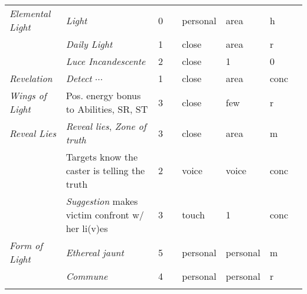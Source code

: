 \documentclass[10pt,a4paper]{article}
\begin{document}
\begin{table}[htbp!]
\begin{tabular}{llllllll}
    \hline
    \multirow{1}{*}{\textit{Elemental Light}} & \textit{Light} & 0 && personal & area & h \\
    										& \textit{Daily Light} & 1 && close & area & r \\
    										& \textit{Luce Incandescente} & 2 && close & 1 & 0 \\
    										
    \hline
    \multirow{1}{*}{\textit{Revelation}} & \textit{Detect $\cdots$} & 1 && close & area & conc \\
    \hline
    \multirow{1}{*}{\textit{Wings of Light}} & Pos. energy bonus to Abilities, SR, ST & 3 && close & few & r \\
    \hline
    \multirow{1}{*}{\textit{Reveal Lies}} & \textit{Reveal lies}, \textit{Zone of truth} & 3 && close & area & m \\
    									 & Targets know the caster is telling the truth & 2 && voice & voice & conc \\    									      		 & \textit{Suggestion} makes victim confront w/ her li(v)es & 3 && touch & 1 & conc\\
    \hline
    \multirow{1}{*}{\textit{Form of Light}} & \textit{Ethereal jaunt} & 5 && personal & personal & m \\	
    									 & \textit{Commune} & 4 && personal & personal & r \\
    &&&&&&\\
    
\end{tabular}
\end{table} 
\end{document}
